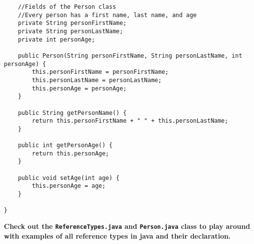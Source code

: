 \documentclass{article}
\begin{document}
\begin{itemize}
\begin{itemize}
\begin{lstlisting}
    //Fields of the Person class
    //Every person has a first name, last name, and age
    private String personFirstName;
    private String personLastName;
    private int personAge;

    public Person(String personFirstName, String personLastName, int personAge) {
        this.personFirstName = personFirstName;
        this.personLastName = personLastName;
        this.personAge = personAge;
    }

    public String getPersonName() {
        return this.personFirstName + " " + this.personLastName;
    }

    public int getPersonAge() {
        return this.personAge;
    }

    public void setAge(int age) {
        this.personAge = age;
    }

}
    \end{lstlisting}
     \end{itemize}
     \textbf{Check out the \texttt{ReferenceTypes.java} and \texttt{Person.java} class to play around with examples of all reference types in java and their declaration.}
\end{itemize}
\end{document}
